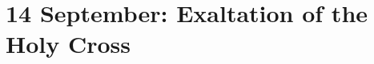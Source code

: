 {
\section{14 September: Exaltation of the Holy Cross}
\subtitle{ Class}
\subtitle{I \& II Vespers}
\medskip

\def\definevesperspropers{}
\def\definevesperspropersalt{%
}
\def\vesperspropersnote{At II Vespers:}
\def\vesperspropersaltnote{\oldneedspace{15\baselineskip}At I Vespers:}
\def\postpsalmtitlethree{\oldneedspace{9\baselineskip}}
\def\prepsalmtitlefour{\needspace{8\baselineskip}}
\def\prepsalmtitlefive{\needspace{8\baselineskip}}
\def\prehymn{\printnote{All kneel for the sixth verse of the following hymn.}}
\def\prehymntranslation{\oldneedspace{3\baselineskip}}

\def\begincollectcols{\begin{parcolumns}[rulebetween,colwidths={1=0.42\linewidth}]{2}}
\bigskip
\benedicamusdomino[2]{}
}